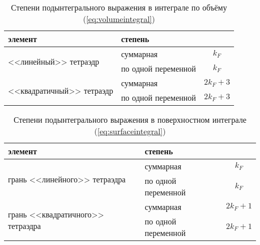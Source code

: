 \begin{table}[h]
	\centering
	\caption{Степени подынтегрального выражения в интеграле по объёму (\ref{eq:volumeintegral})}
	\label{tab:integrationorder:tetra}
	\smallskip
	\begin{tabular}{l l c}
		\toprule
		элемент                                    & \multicolumn{2}{l}{степень} \\
		\midrule
		\multirow{2}{*}{<<линейный>> тетраэдр}     & суммарная           & \(k_F\) \\
		                                           & по одной переменной & \(k_F\) \\
		\midrule
		\multirow{2}{*}{<<квадратичный>> тетраэдр} & суммарная           & \(2k_F + 3\) \\
		                                           & по одной переменной & \(2k_F + 3\) \\
		\bottomrule
	\end{tabular}
\end{table}

\begin{table}[h]
	\centering
	\caption{Степени подынтегрального выражения в поверхностном интеграле (\ref{eq:surfaceintegral})}
	\label{tab:integrationparam:tetra}
	\smallskip
	\begin{tabular}{l l c}
		\toprule
		элемент & \multicolumn{2}{l}{степень} \\
		\midrule
		\multirow{2}{*}{грань <<линейного>> тетраэдра}     & суммарная           & \(k_F\) \\
		                                                   & по одной переменной & \(k_F\) \\
		\midrule
		\multirow{2}{*}{грань <<квадратичного>> тетраэдра} & суммарная           & \(2k_F + 1\) \\
		                                                   & по одной переменной & \(2k_F + 1\) \\
		\bottomrule
	\end{tabular}
\end{table}


